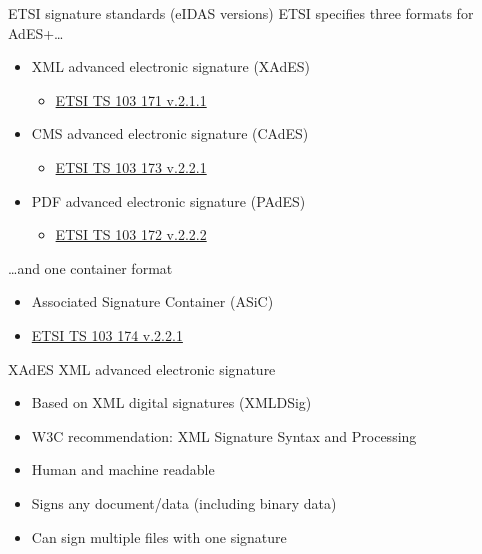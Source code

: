 \begin{frame}{ETSI signature standards (eIDAS versions)}
  ETSI specifies three formats for AdES+\dots
  \begin{itemize}[<+(1)->]
    \item XML advanced electronic signature (XAdES)
    \begin{itemize}
      \item \href{http://www.etsi.org/deliver/etsi_ts/103100_103199/103171/02.01.01_60/ts_103171v020101p.pdf}{ETSI TS 103 171 v.2.1.1}
    \end{itemize}
    \item CMS advanced electronic signature (CAdES)
    \begin{itemize}
      \item \href{http://www.etsi.org/deliver/etsi_ts/103100_103199/103173/02.02.01_60/ts_103173v020201p.pdf}{ETSI TS 103 173 v.2.2.1}
    \end{itemize}
    \item PDF advanced electronic signature (PAdES)
    \begin{itemize}
      \item \href{http://www.etsi.org/deliver/etsi_ts/103100_103199/103172/02.02.02_60/ts_103172v020202p.pdf}{ETSI TS 103 172 v.2.2.2}
    \end{itemize}
  \end{itemize}

  \pause
  \dots and one container format
  \pause
  \begin{itemize}
    \item Associated Signature Container (ASiC)
    \item \href{http://www.etsi.org/deliver/etsi_ts/103100_103199/103174/02.02.01_60/ts_103174v020201p.pdf}{ETSI TS 103 174 v.2.2.1}
  \end{itemize}
\end{frame}

\begin{frame}{XAdES}
  XML advanced electronic signature
  \begin{itemize}[<+(1)->]
    \item Based on XML digital signatures (XMLDSig)
    \item W3C recommendation: XML Signature Syntax and Processing
    \item Human and machine readable
    \item Signs any document/data (including binary data)
    \item Can sign multiple files with one signature
  \end{itemize}    
\end{frame}


